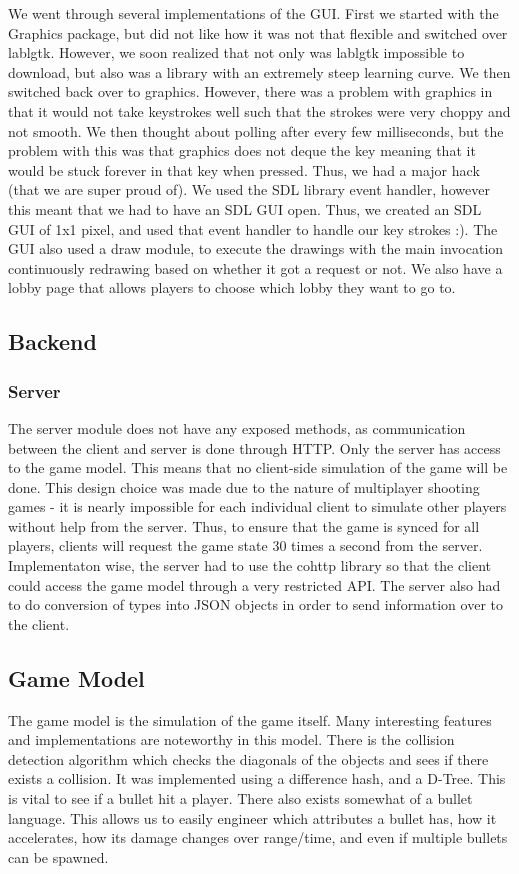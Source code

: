 \documentclass{article}
\begin{document}
	We went through several implementations of the GUI. First we started with the Graphics package, but did not like how it was not that flexible and switched over lablgtk. However, we soon realized that not only was lablgtk impossible to download, but also was a library with an extremely steep learning curve. We then switched back over to graphics. However, there was a problem with graphics in that it would not take keystrokes well such that the strokes were very choppy and not smooth. We then thought about polling after every few milliseconds, but the problem with this was that graphics does not deque the key meaning that it would be stuck forever in that key when pressed. Thus, we had a major hack (that we are super proud of). We used the SDL library event handler, however this meant that we had to have an SDL GUI open. Thus, we created an SDL GUI of 1x1 pixel, and used that event handler to handle our key strokes :). The GUI also used a draw module, to execute the drawings with the main invocation continuously redrawing based on whether it got a request or not. We also have a lobby page that allows players to choose which lobby they want to go to.

	\subsection{Backend}
	\subsubsection{Server}
	The server module does not have any exposed methods, as communication between the client and server is done through HTTP. Only the server has access to the game model. This means that no client-side simulation of the game will be done. This design choice was made due to the nature of multiplayer shooting games - it is nearly impossible for each individual client to simulate other players without help from the server. Thus, to ensure that the game is synced for all players, clients will request the game state 30 times a second from the server. Implementaton wise, the server had to use the cohttp library so that the client could access the game model through a very restricted API. The server also had to do conversion of types into JSON objects in order to send information over to the client.
	
	\subsection{Game Model}
    	The game model is the simulation of the game itself. Many interesting features and implementations are noteworthy in this model. There is the collision detection algorithm which checks the diagonals of the objects and sees if there exists a collision. It was implemented using a difference hash, and a D-Tree. This is vital to see if a bullet hit a player. There also exists somewhat of a bullet language. This allows us to easily engineer which attributes a bullet has, how it accelerates, how its damage changes over range/time, and even if multiple bullets can be spawned.
\end{document}
